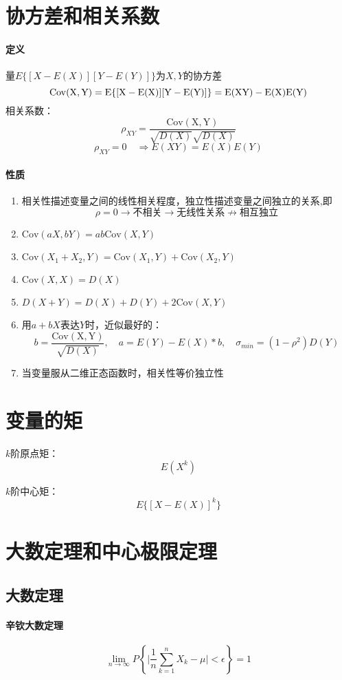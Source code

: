 \documentclass[12pt]{report}
\begin{document}
\section{协方差和相关系数}

\paragraph{定义}
量$E\{[X-E(X)][Y-E(Y)]\}$为$X,Y$的协方差
$$\rm{Cov}(X,Y)=E\{[X-E(X)][Y-E(Y)]\}=E(XY)-E(X)E(Y)$$
相关系数：
$$\rho_{XY}=\frac{\mathrm{Cov(X,Y)}}{\sqrt{D(X)}\sqrt{D(X)}}$$
$$\rho_{XY}=0 \quad\Rightarrow E(XY)=E(X)E(Y)$$

\paragraph{性质}
\begin{enumerate}
    \item 相关性描述变量之间的线性相关程度，独立性描述变量之间独立的关系,即$$\rho=0 \rightarrow \mbox{不相关}\rightarrow \mbox{无线性关系}\nrightarrow \mbox{相互独立}$$
    \item $\mathrm{Cov}(aX,bY)=ab\mathrm{Cov}(X,Y)$
    \item $\mathrm{Cov}(X_1+X_2,Y)=\mathrm{Cov}(X_1,Y)+\mathrm{Cov}(X_2,Y)$
    \item $\mathrm{Cov}(X,X)=D(X)$
    \item $D(X+Y)=D(X)+D(Y)+2\mathrm{Cov}(X,Y)$
    \item 用$a+bX$表达$Y$时，近似最好的：$$b=\frac{\mathrm{Cov(X,Y)}}{\sqrt{D(X)}},\quad a=E(Y)-E(X)*b,\quad \sigma_{min}=(1-\rho ^2)D(Y)$$
    \item 当变量服从二维正态函数时，相关性等价独立性
\end{enumerate}

\section{变量的矩}
$k$阶原点矩：
$$E(X^k)$$

$k$阶中心矩：
$$E\{[X-E(X)]^k\}$$
\section{大数定理和中心极限定理}

\subsection{大数定理}

\paragraph{辛钦大数定理}
$$\lim_{n\rightarrow \infty}P\left\{\bigg|\frac{1}{n}\sum_{k=1}^n X_k-\mu\bigg|<\epsilon\right\}=1$$
\end{document}
